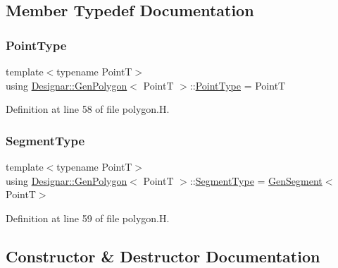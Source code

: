 \subsection{Member Typedef Documentation}
\mbox{\label{class_designar_1_1_gen_polygon_a257735320e85cb672973f88f01625632}} 
\subsubsection{\texorpdfstring{Point\+Type}{PointType}}
{\footnotesize\ttfamily template$<$typename PointT$>$ \\
using \hyperlink{class_designar_1_1_gen_polygon}{Designar\+::\+Gen\+Polygon}$<$ PointT $>$\+::\hyperlink{class_designar_1_1_gen_polygon_a257735320e85cb672973f88f01625632}{Point\+Type} =  PointT}



Definition at line 58 of file polygon.\+H.

\mbox{\label{class_designar_1_1_gen_polygon_a06fe54118b31269c3fc76cc9b5e55654}} 
\subsubsection{\texorpdfstring{Segment\+Type}{SegmentType}}
{\footnotesize\ttfamily template$<$typename PointT$>$ \\
using \hyperlink{class_designar_1_1_gen_polygon}{Designar\+::\+Gen\+Polygon}$<$ PointT $>$\+::\hyperlink{class_designar_1_1_gen_polygon_a06fe54118b31269c3fc76cc9b5e55654}{Segment\+Type} =  \hyperlink{class_designar_1_1_gen_segment}{Gen\+Segment}$<$PointT$>$}



Definition at line 59 of file polygon.\+H.



\subsection{Constructor \& Destructor Documentation}
\mbox{\label{class_designar_1_1_gen_polygon_a309794dce5861b9f5c158ea48a01be3e}} 
